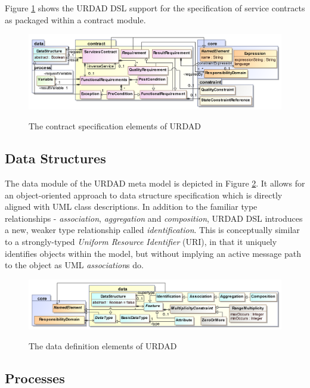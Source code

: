 Figure \ref{fig:contractModule} shows the URDAD DSL support for the specification of service contracts as packaged within a contract module.

\begin{figure}[tb]
  \centering
  \includegraphics{contract}\\   
  \caption{The contract specification elements of URDAD}
  \label{fig:contractModule}
\end{figure}

\subsection{Data Structures}

The data module of the URDAD meta model is depicted in Figure \ref{fig:dataStructureModule}. It allows for an object-oriented approach to data structure specification which is directly aligned with UML class descriptions. In addition to the familiar type relationships - \emph{association}, \emph{aggregation} and \emph{composition}, URDAD DSL introduces a new, weaker type relationship called \emph{identification}. This is conceptually similar to a strongly-typed \emph{Uniform Resource Identifier} (URI), in that it uniquely identifies objects within the model, but without implying an active message path to the object as UML \emph{association}s do.
 
\begin{figure}[tb]
  \centering
  \includegraphics{data}\\   
  \caption{The data definition elements of URDAD}
  \label{fig:dataStructureModule}
\end{figure}

\subsection{Processes}

